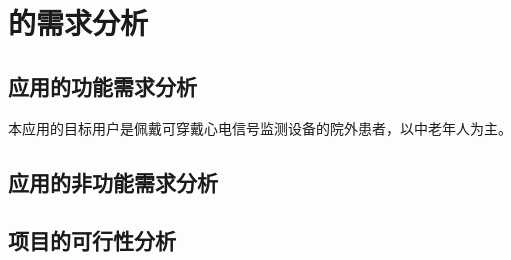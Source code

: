 \chapter{\app 的需求分析}\label{ch:req}


\section{应用的功能需求分析}\label{sec:func-req}

本应用的目标用户是佩戴可穿戴心电信号监测设备的院外患者，以中老年人为主。



\section{应用的非功能需求分析}\label{sec:nonfunc-req}



\section{项目的可行性分析}\label{sec:feasibility}

